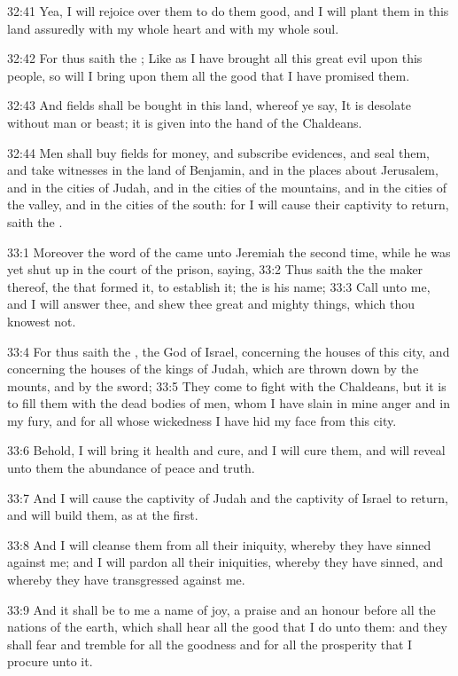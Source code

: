 32:41 Yea, I will rejoice over them to do them good, and I will plant
them in this land assuredly with my whole heart and with my whole
soul.

32:42 For thus saith the \LORD; Like as I have brought all this great
evil upon this people, so will I bring upon them all the good that I
have promised them.

32:43 And fields shall be bought in this land, whereof ye say, It is
desolate without man or beast; it is given into the hand of the
Chaldeans.

32:44 Men shall buy fields for money, and subscribe evidences, and
seal them, and take witnesses in the land of Benjamin, and in the
places about Jerusalem, and in the cities of Judah, and in the cities
of the mountains, and in the cities of the valley, and in the cities
of the south: for I will cause their captivity to return, saith the
\LORD.

33:1 Moreover the word of the \LORD came unto Jeremiah the second time,
while he was yet shut up in the court of the prison, saying, 33:2 Thus
saith the \LORD the maker thereof, the \LORD that formed it, to
establish it; the \LORD is his name; 33:3 Call unto me, and I will
answer thee, and shew thee great and mighty things, which thou knowest
not.

33:4 For thus saith the \LORD, the God of Israel, concerning the houses
of this city, and concerning the houses of the kings of Judah, which
are thrown down by the mounts, and by the sword; 33:5 They come to
fight with the Chaldeans, but it is to fill them with the dead bodies
of men, whom I have slain in mine anger and in my fury, and for all
whose wickedness I have hid my face from this city.

33:6 Behold, I will bring it health and cure, and I will cure them,
and will reveal unto them the abundance of peace and truth.

33:7 And I will cause the captivity of Judah and the captivity of
Israel to return, and will build them, as at the first.

33:8 And I will cleanse them from all their iniquity, whereby they
have sinned against me; and I will pardon all their iniquities,
whereby they have sinned, and whereby they have transgressed against
me.

33:9 And it shall be to me a name of joy, a praise and an honour
before all the nations of the earth, which shall hear all the good
that I do unto them: and they shall fear and tremble for all the
goodness and for all the prosperity that I procure unto it.

